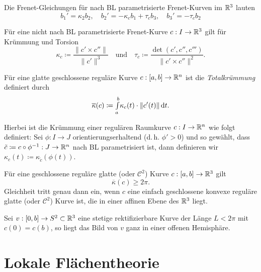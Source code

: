 \documentclass{cheat-sheet}
\newcommand{\Intabdt}[1]{\Int{a}{b}{#1}{t}}
\begin{document}
\begin{bem}
  Die Frenet-Gleichungen für nach BL parametrisierte Frenet-Kurven im $\mathbb{R}^3$ lauten
  \[
      b_1' = \kappa_2 b_2, \quad
      b_2' = - \kappa_c b_1 + \tau_c b_3, \quad
      b_3' = - \tau_c b_2
  \]
\end{bem}


\begin{bem}
  Für eine nicht nach BL parametrisierte Frenet-Kurve $c : I \to \mathbb{R}^3$ gilt für Krümmung und Torsion
  \[ \kappa_c \coloneqq \frac{\| c' \times c'' \|}{\| c' \|^3} \quad \text{und} \quad \tau_c \coloneqq \frac{\det(c', c'', c''')}{\| c' \times c'' \|^2}. \]
\end{bem}


\begin{definition}
  Für eine glatte geschlossene reguläre Kurve $c : [a, b] \to \mathbb{R}^n$ ist die \emph{Totalkrümmung} definiert durch
  \[ \overline\kappa(c) \coloneqq \Intabdt{\kappa_c(t) \cdot \| c'(t) \|}. \]

  Hierbei ist die Krümmung einer regulären Raumkurve $c : I \to \mathbb{R}^n$ wie folgt definiert:
  Sei $\phi : I \to J$ orientierungserhaltend
  (d.\,h. $\phi' > 0$) und so gewählt,
  dass $\tilde{c} \coloneqq c \circ \phi^{-1} : J \to \mathbb{R}^n$ nach
  BL parametrisiert ist, dann definieren wir $\kappa_c(t) \coloneqq \kappa_{\tilde{c}}(\phi(t))$.
\end{definition}

\begin{satz}[Fenchel]
  Für eine geschlossene reguläre glatte (oder $\mathcal{C}^2$) Kurve $c : [a, b] \to \mathbb{R}^3$ gilt
  \[ \overline\kappa(c) \geq 2 \pi. \]
  Gleichheit tritt genau dann ein, wenn $c$ eine einfach geschlossene konvexe reguläre glatte (oder $\mathcal{C}^2$) Kurve ist, die in einer affinen Ebene des $\mathbb{R}^3$ liegt.
\end{satz}

\begin{satz}
  Sei $v : [0, b] \to S^2 \subset \mathbb{R}^3$ eine stetige rektifizierbare Kurve der Länge $L < 2 \pi$
mit $c(0) = c(b)$, so liegt das Bild von $v$ ganz in einer offenen Hemisphäre.
\end{satz}


\section{Lokale Flächentheorie}
\end{document}
